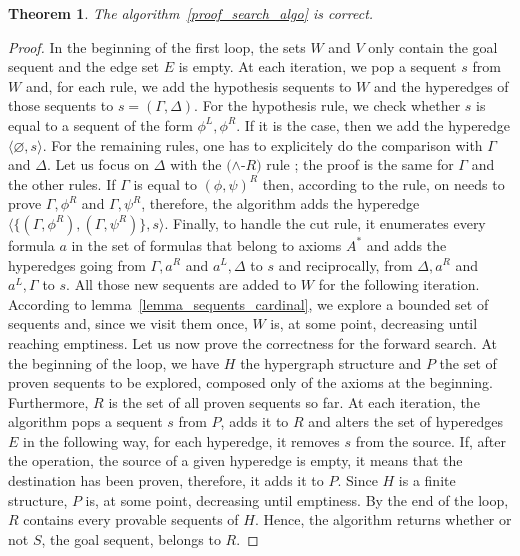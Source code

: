 \documentclass[a4paper, 11pt]{article}
\newtheorem{theorem}{Theorem}
\begin{document}
    \begin{theorem}
	    The algorithm~\ref{proof_search_algo} is correct.
    \end{theorem}
    \begin{proof}
	In the beginning of the first loop, the sets $W$ and $V$ only contain the goal sequent and the
	    edge set $E$ is empty. At each iteration, we pop a sequent $s$ from $W$ and, for each rule,
	    we add the hypothesis sequents to $W$ and the hyperedges of those sequents to 
	    $s=(\Gamma,\Delta)$. For the 
	    hypothesis rule, we check whether $s$ is equal to a sequent of the form $\phi^L,\phi^R$.
	    If it is the case, then we add the hyperedge $\langle\varnothing,s\rangle$. For the
	    remaining rules, one has to explicitely do the comparison with $\Gamma$ and $\Delta$. Let us
	    focus on $\Delta$ with the $(\wedge$-$R)$ rule ; the proof is the same for $\Gamma$ and the
	    other rules. If $\Gamma$ is equal to $(\phi,\psi)^R$ then, according to the rule, on needs
	    to prove $\Gamma,\phi^R$ and $\Gamma,\psi^R$, therefore, the algorithm adds the hyperedge
	    $\langle\{(\Gamma,\phi^R),(\Gamma,\psi^R)\},s\rangle$. Finally, to handle the cut rule,
	    it enumerates every formula $a$ in the set of formulas that belong to axioms $A^*$ and
	    adds the hyperedges going from $\Gamma,a^R$ and $a^L,\Delta$ to $s$ and reciprocally, from
	    $\Delta,a^R$ and $a^L,\Gamma$ to $s$. All those new sequents are added to $W$ for the
	    following iteration. According to lemma~\ref{lemma_sequents_cardinal}, we explore a bounded
	    set of sequents and, since we visit them once, $W$ is, at some point, decreasing until
	    reaching emptiness.
	    Let us now prove the correctness for the forward search. At the beginning of the loop, we
	    have $H$ the hypergraph structure and $P$ the set of proven
	    sequents to be explored, composed only of the axioms at the beginning. Furthermore, $R$ is
	    the set of all proven sequents so far. At each iteration, the algorithm pops a sequent
	    $s$ from $P$, adds it to $R$ and alters the set of hyperedges $E$ in the following way,
	    for each hyperedge, it removes $s$ from the source. If, after the operation, the source
	    of a given hyperedge is empty, it means that the destination has been proven, therefore, it
	    adds it to $P$. Since $H$ is a finite structure, $P$ is, at some point, decreasing until 
	    emptiness. By the end of the loop, $R$ contains every provable sequents of $H$. Hence, the
	    algorithm returns whether or not $S$, the goal sequent, belongs to $R$.
    \end{proof}
\end{document}
